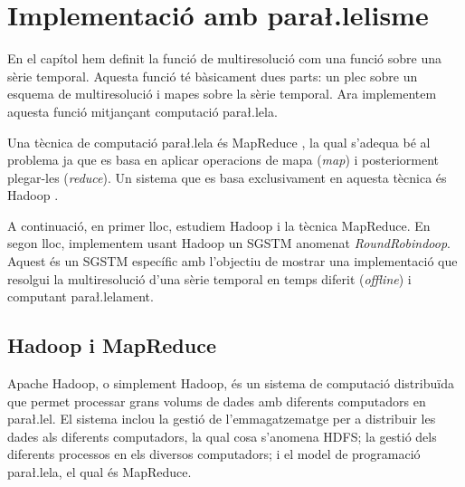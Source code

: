 \chapter{Implementació amb para\l.lelisme}
\label{sec:implementacio:mapreduce}




En el capítol  hem definit la funció de
multiresolució com una funció sobre una sèrie temporal. Aquesta funció
té bàsicament dues parts: un plec sobre un esquema de multiresolució i
mapes sobre la sèrie temporal. Ara implementem
aquesta funció mitjançant computació para\l.lela.


Una tècnica de computació para\l.lela és
MapReduce \parencite{deanghemawat04:mapreduce}, la qual s'adequa bé al
problema ja que es basa en aplicar operacions de mapa (\emph{map}) i
posteriorment plegar-les (\emph{reduce}). Un sistema que es basa
exclusivament en aquesta tècnica és
Hadoop \parencite{hadoop}.

A continuació, en primer lloc, estudiem Hadoop i la tècnica MapReduce.
En segon lloc, implementem usant Hadoop un \gls{SGSTM} anomenat
\emph{RoundRobindoop}. Aquest és un \gls{SGSTM} específic amb
l'objectiu de mostrar una implementació que resolgui la multiresolució
d'una sèrie temporal en temps diferit (\emph{offline}) i computant
para\l.lelament.




\section{Hadoop i MapReduce}


Apache Hadoop, o simplement Hadoop, \parencite{hadoop} és un sistema
de computació distribuïda que permet processar grans volums de dades
amb diferents computadors en para\l.lel. El sistema inclou la gestió
de l'emmagatzematge per a distribuir les dades als diferents
computadors, la qual cosa s'anomena \gls{HDFS}; la gestió dels
diferents processos en els diversos computadors; i el model de
programació para\l.lela, el qual és MapReduce.


